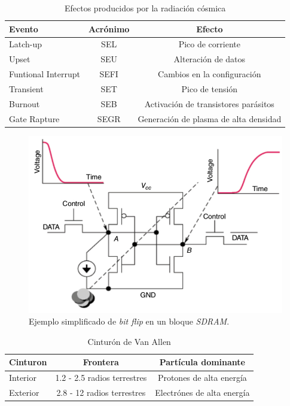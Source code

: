 \begin{table}[h]
	\centering
	\caption[Efectos de la radiación cósmica]{Efectos producidos por la radiación cósmica\citep{WEBSITE:structure_space_radiation}}
	\begin{tabular}{l c c}    
		\toprule
		\textbf{Evento}      & \textbf{Acrónimo} & \textbf{Efecto}\\
		\midrule
		Latch-up             & SEL               & Pico de corriente\\		
		Upset                & SEU               & Alteración de datos\\
		Funtional Interrupt  & SEFI              & Cambios en la configuración\\
		Transient            & SET               & Pico de tensión\\
		Burnout              & SEB               & Activación de transistores parásitos\\
		Gate Rapture         & SEGR              & Generación de plasma de alta densidad\\
		\bottomrule
		\hline
	\end{tabular}
	\label{tab:radiacion}
\end{table}

\begin{figure}[htbp]
	\centering
	\includegraphics[width=.8\textwidth]{./Figures/bitflip.jpg}
    \caption{Ejemplo simplificado de \emph{bit flip} en un bloque \emph{SDRAM}\citep{WEBSITE:effects_on_devices}.}
	\label{fig:bitflip}
\end{figure}

\begin{table}[h]
	\centering
	\caption[Cinturón de Van Allen]{Cinturón de Van Allen\citep{WEBSITE:structure_space_radiation}}
	\begin{tabular}{l c c}    
		\toprule
		\textbf{Cinturon} & \textbf{Frontera}           & \textbf{Partícula dominante}\\
		\midrule
		Interior          & 1.2 - 2.5 radios terrestres & Protones de alta energía\\		
		Exterior          & 2.8 - 12 radios terrestres  & Electrónes de alta energía\\
		\bottomrule
		\hline
	\end{tabular}
	\label{tab:capasmagneticas}
\end{table}

